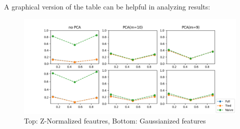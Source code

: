 \documentclass[10pt, a4paper, twocolumn]{article} %
\begin{document}
A graphical version of the table can be helpful in analyzing results:
\begin{figure}[ht!]
	\includegraphics[width=\linewidth]{./Pictures/FeaturesAnalysis/gaumodels.png}
	\caption{Top: Z-Normalized feautres, Bottom: Gaussianized features}
	\label{gauplots} 
\end{figure}
\end{document}
